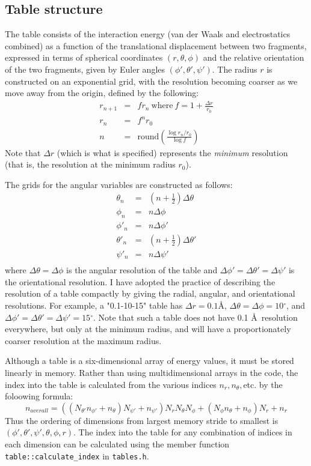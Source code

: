 \documentclass{article}      %
\begin{document}
\subsection{Table structure}
The table consists of the interaction energy (van der Waals and electrostatics combined) as a function of the translational displacement between two fragments, expressed in terms of spherical coordinates $(r, \theta, \phi)$ and the relative orientation of the two fragments, given by Euler angles $(\phi', \theta', \psi')$.  The radius $r$ is constructed on an exponential grid, with the resolution becoming coarser as we move away from the origin,  defined by the following:
\begin{eqnarray}
r_{n+1} &=& f r_n\ \textrm{where}\ f=1+\frac{\Delta r}{r_0} \\
r_n &=& f^n r_0 \nonumber\\
n &=& \textrm{round}\left(\frac{\log r_n/r_0}{\log f}\right) \nonumber
\end{eqnarray}
Note that $\Delta r$ (which is what is specified) represents the \emph{minimum} resolution (that is, the resolution at the minimum radius $r_0$).  

The grids for the angular variables  are constructed as follows:
\begin{eqnarray}
\theta_n&=& \left(n+\frac{1}{2}\right) \Delta \theta \\
\phi_n &=& n \Delta \phi \\
\phi'_n &=& n \Delta \phi' \\
\theta'_n &=& (n+\frac{1}{2}) \Delta \theta' \\
\psi'_n &=& n \Delta \psi' \\
\end{eqnarray}
where $\Delta \theta = \Delta \phi$ is the angular resolution of the table and $\Delta \phi' = \Delta \theta' = \Delta \psi'$ is the orientational resolution.  I have adopted the practice of describing the resolution of a table compactly by giving the radial, angular, and orientational resolutions.  For example, a "0.1-10-15" table has $\Delta r = 0.1 \textrm{\AA}$, $\Delta \theta = \Delta \phi = 10{}^\circ$, and $\Delta \phi' = \Delta \theta' = \Delta \psi' = 15{}^\circ$.  Note that such a table does not have 0.1 \AA\ resolution everywhere, but only at the minimum radius, and will have a proportionately coarser resolution at the maximum radius.  

Although a table is a six-dimensional array of energy values, it must be stored linearly in memory.  Rather than using multidimensional arrays in the code, the index into the table is calculated from the various indices $n_r, n_\theta, $etc.  by the foloowing formula:
\begin{equation}
n_{overall} = ((N_{\theta'} n_{\phi'} + n_\theta) N_{\psi'} + n_{\psi'}) N_r N_\theta N_\phi + (N_\phi n_\theta + n_\phi) N_r + n_r
\end{equation}
Thus the ordering of dimensions from largest memory stride to smallest is $(\phi', \theta', \psi', \theta, \phi, r)$.    The index into the table for any combination of indices in each dimension can be calculated using the member function \verb+table::calculate_index+ in \verb+tables.h+.
\end{document}
